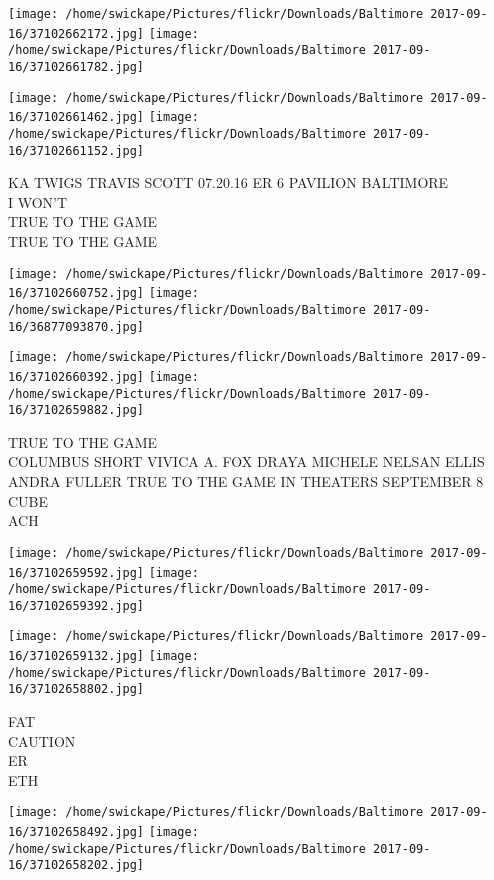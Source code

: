 \documentclass[10pt,letterpaper]{article}
\begin{document}
\texttt{[image: /home/swickape/Pictures/flickr/Downloads/Baltimore 2017-09-16/37102662172.jpg]}
\texttt{[image: /home/swickape/Pictures/flickr/Downloads/Baltimore 2017-09-16/37102661782.jpg]}

\texttt{[image: /home/swickape/Pictures/flickr/Downloads/Baltimore 2017-09-16/37102661462.jpg]}
\texttt{[image: /home/swickape/Pictures/flickr/Downloads/Baltimore 2017-09-16/37102661152.jpg]}

KA TWIGS TRAVIS SCOTT 07.20.16 ER 6 PAVILION BALTIMORE\\
I WON'T\\
TRUE TO THE GAME\\
TRUE TO THE GAME
\pagebreak

\texttt{[image: /home/swickape/Pictures/flickr/Downloads/Baltimore 2017-09-16/37102660752.jpg]}
\texttt{[image: /home/swickape/Pictures/flickr/Downloads/Baltimore 2017-09-16/36877093870.jpg]}

\texttt{[image: /home/swickape/Pictures/flickr/Downloads/Baltimore 2017-09-16/37102660392.jpg]}
\texttt{[image: /home/swickape/Pictures/flickr/Downloads/Baltimore 2017-09-16/37102659882.jpg]}

TRUE TO THE GAME\\
COLUMBUS SHORT VIVICA A. FOX DRAYA MICHELE NELSAN ELLIS ANDRA FULLER TRUE TO THE GAME IN THEATERS SEPTEMBER 8\\
CUBE\\
ACH
\pagebreak

\texttt{[image: /home/swickape/Pictures/flickr/Downloads/Baltimore 2017-09-16/37102659592.jpg]}
\texttt{[image: /home/swickape/Pictures/flickr/Downloads/Baltimore 2017-09-16/37102659392.jpg]}

\texttt{[image: /home/swickape/Pictures/flickr/Downloads/Baltimore 2017-09-16/37102659132.jpg]}
\texttt{[image: /home/swickape/Pictures/flickr/Downloads/Baltimore 2017-09-16/37102658802.jpg]}

FAT\\
CAUTION\\
ER\\
ETH
\pagebreak

\texttt{[image: /home/swickape/Pictures/flickr/Downloads/Baltimore 2017-09-16/37102658492.jpg]}
\texttt{[image: /home/swickape/Pictures/flickr/Downloads/Baltimore 2017-09-16/37102658202.jpg]}
\end{document}

